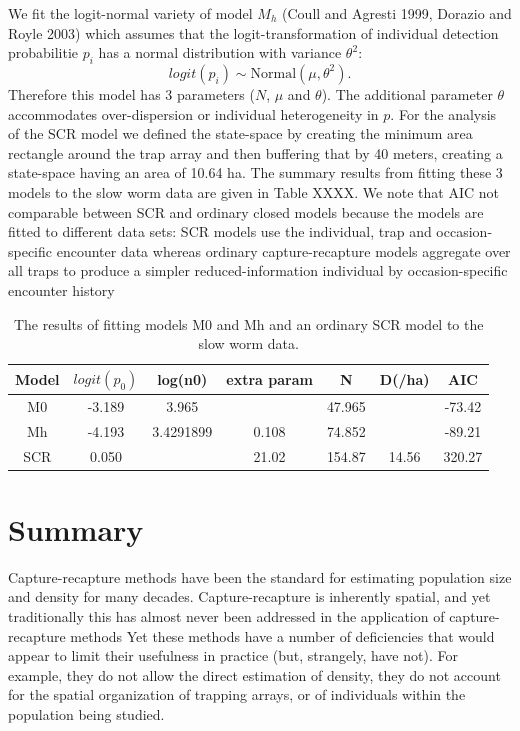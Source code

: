 \documentclass{book}
\begin{document}
We fit the logit-normal variety of model $M_h$ (Coull and Agresti
1999, Dorazio and Royle 2003) which assumes that the
logit-transformation of individual detection probabilitie $p_i$ has a
normal distribution with variance $\theta^2$:
\[
 logit(p_i) \sim \mbox{Normal}(\mu, \theta^2).
\]
Therefore this model has 3 parameters ($N$, $\mu$ and $\theta$).  The
additional parameter $\theta$ accommodates over-dispersion or
individual heterogeneity in $p$. 
For the analysis of the SCR model we defined
 the state-space by creating the minimum area rectangle around the trap array
and then buffering that by 40 meters, creating a state-space having an
area of 10.64 ha. 
The summary results from fitting these 3 models to the slow worm data
are given in Table XXXX. We note that 
AIC not comparable between SCR and ordinary closed models because the
models are fitted to different data sets:
SCR models use the individual, trap and occasion-specific
encounter data whereas ordinary capture-recapture models aggregate
over all traps to produce a simpler reduced-information individual by
occasion-specific encounter history


\begin{table}[ht]
\centering
\caption{The results of fitting models M0 and Mh and an ordinary SCR
  model to the slow worm data. }
\begin{tabular}{ccccccc}
Model &  $logit(p_0)$ &  log(n0) & extra param &   N    &  D(/ha)  &    AIC \\ \hline
 M0   & -3.189       & 3.965     &           & 47.965 &       & -73.42 \\
 Mh   & -4.193       & 3.4291899 &0.108     & 74.852 &       & -89.21 \\
SCR   &  0.050        &          & 21.02     & 154.87 & 14.56 &  320.27 \\
\end{tabular}
\end{table}





\section{Summary}

Capture-recapture methods have been the standard for estimating
population size and density for many decades. 
Capture-recapture is inherently spatial, and yet traditionally this
has almost never been addressed in the application of capture-recapture methods
 Yet these methods have
a number of deficiencies that would appear to limit their usefulness
in practice (but, strangely, have not). For example, they do not allow
the direct estimation of density, they do not account for the spatial
organization of trapping arrays, or of individuals within the
population being studied. 
\end{document}
